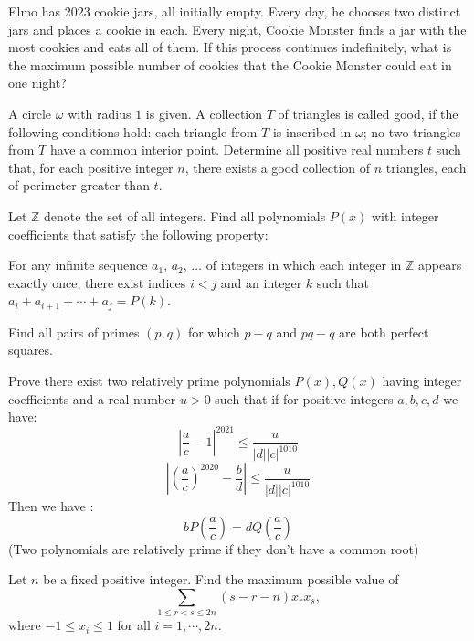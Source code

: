 \documentclass[11pt]{scrartcl}
\begin{document}
\begin{problem}[2258867823273260514]
Elmo has 2023 cookie jars, all initially empty. Every day, he chooses two distinct jars and places a cookie in each. Every night, Cookie Monster finds a jar with the most cookies and eats all of them. If this process continues indefinitely, what is the maximum possible number of cookies that the Cookie Monster could eat in one night?
\end{problem}
\begin{problem}[2265193939454652363]
	A circle $\omega$ with radius $1$ is given. A collection $T$ of triangles is called good, if the following conditions hold:
each triangle from $T$ is inscribed in $\omega$;
no two triangles from $T$ have a common interior point.
Determine all positive real numbers $t$ such that, for each positive integer $n$, there exists a good collection of $n$ triangles, each of perimeter greater than $t$.
\end{problem}
\begin{problem}[2270109693486247508]
Let $\mathbb{Z}$ denote the set of all integers. Find all polynomials $P(x)$ with integer coefficients that satisfy the following property:

For any infinite sequence $a_1$, $a_2$, $\dotsc$ of integers in which each integer in $\mathbb{Z}$ appears exactly once, there exist indices $i < j$ and an integer $k$ such that $a_i +a_{i+1} +\dotsb +a_j = P(k)$.
\end{problem}
\begin{problem}[2302470517258475835]
	Find all pairs of primes $(p, q)$ for which $p-q$ and $pq-q$ are both perfect squares.
\end{problem}
\begin{problem}[2315044936293855308]
Prove there exist two relatively prime polynomials $P(x),Q(x)$ having integer coefficients and a real number $u>0$ such that if for positive integers $a,b,c,d$ we have:
$$|\frac{a}{c}-1|^{2021} \le \frac{u}{|d||c|^{1010}}$$$$| (\frac{a}{c})^{2020}-\frac{b}{d}| \le \frac{u}{|d||c|^{1010}}$$Then we have :
$$bP(\frac{a}{c})=dQ(\frac{a}{c})$$
(Two polynomials are relatively prime if they don't have a common root)
\end{problem}
\begin{problem}[2350680529866748619]
Let $n$ be a fixed positive integer. Find the maximum possible value of\[ \sum_{1 \le r < s \le 2n} (s-r-n)x_rx_s, \]where $-1 \le x_i \le 1$ for all $i = 1, \cdots , 2n$.
\end{problem}
\end{document}
